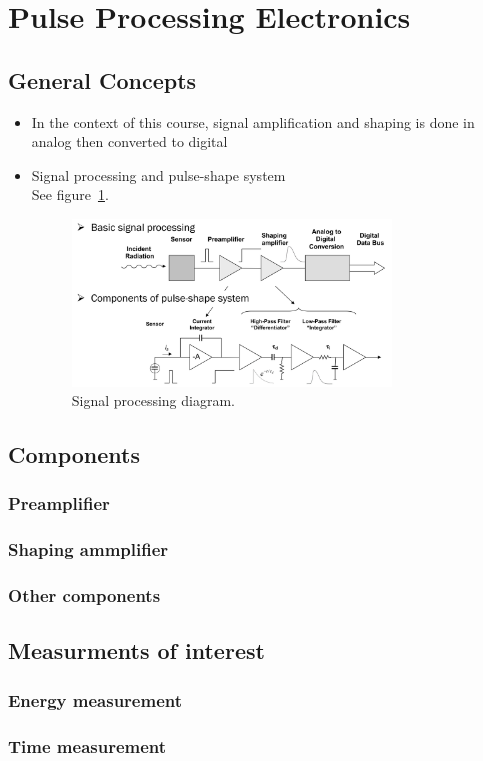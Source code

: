 \section{Pulse Processing Electronics}
\subsection{General Concepts}
\begin{itemize}
    \item In the context of this course, signal amplification and shaping is done in analog then converted to digital  
    \item Signal processing and pulse-shape system\\
    See figure~\ref{fig:signal_processing}.
    \begin{figure}[ht]
        \centering
        \includegraphics[width=0.8\textwidth]{images/signal_processing_diagram.png}
        \caption{Signal processing diagram.}
        \label{fig:signal_processing}
    \end{figure}
\end{itemize}
\subsection{Components}
\subsubsection{Preamplifier}

\subsubsection{Shaping ammplifier}
\subsubsection{Other components}
\subsection{Measurments of interest}
\subsubsection{Energy measurement}
\subsubsection{Time measurement}